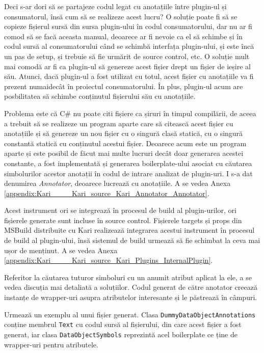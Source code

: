 \documentclass[a4paper,12pt]{report}
\begin{document}
Deci s-ar dori să se partajeze codul legat cu anotațiile între plugin-ul și consumatorul, însă cum să se realizeze acest lucru?
O soluție poate fi să se copieze fișierul sursă din sursa plugin-ului în codul consumatorului, dar nu ar fi comod să se facă aceasta manual, deoarece ar fi nevoie ca el să schimbe și în codul sursă al consumatorului când se schimbă interfața plugin-ului, și este încă un pas de setup, și trebuie să fie urmărit de source control, etc.
O soluție mult mai comodă ar fi ca plugin-ul să genereze acest fișier drept un fișier de ieșire al său.
Atunci, dacă plugin-ul a fost utilizat cu totul, acest fișier cu anotațiile va fi prezent numaidecât în proiectul consumatorului.
În plus, plugin-ul acum are posbilitatea să schimbe conținutul fișierului său cu anotațiile.

Problema este că C\# nu poate citi fișiere ca șiruri în timpul compilării, de aceea a trebuit să se realizeze un program aparte care să citească acest fișier cu anotațiile și să genereze un nou fișier cu o singură clasă statică, cu o singură constantă statică cu conținutul acestui fișier.
Deoarece acum este un program aparte și este posibil de făcut mai multe lucruri decât doar generarea acestei constante, a fost implementată și generarea boilerplate-ului asociat cu căutarea simbolurilor acestor anotații în codul de intrare analizat de plugin-uri.
I s-a dat denumirea \emph{Annotator}, deoarece lucrează cu anotațiile.
A se vedea Anexa \ref{appendix:Kari____Kari_source_Kari_Annotator_Annotator}.

Acest instrument ori se integrează în procesul de build al plugin-urilor, ori fișierele generate sunt incluse în source control.
Fișierele targets și props din MSBuild distribuite cu Kari realizează integrarea acestui instrument în procesul de build al plugin-ului,
însă sistemul de build urmează să fie schimbat la ceva mai ușor de menținut.
A se vedea Anexa \ref{appendix:Kari____Kari_source_Kari_Plugins_InternalPlugin}.


Referitor la căutarea tuturor simboluri cu un anumit atribut aplicat la ele, a se vedea discuția mai detaliată a soluțiilor.
Codul generat de către anotator creează instanțe de wrapper-uri asupra atributelor interesante și le păstrează în câmpuri.\cite{converting_attributes_roslyn}


Urmează un exemplu al unui fișier generat.
Clasa \texttt{DummyDataObjectAnnotations} conține membrul \texttt{Text} cu codul sursă al fișierului, din care acest fișier a fost generat,
iar clasa \texttt{DataObjectSymbols} reprezintă acel boilerplate ce ține de wrapper-uri pentru atributele.
\end{document}
